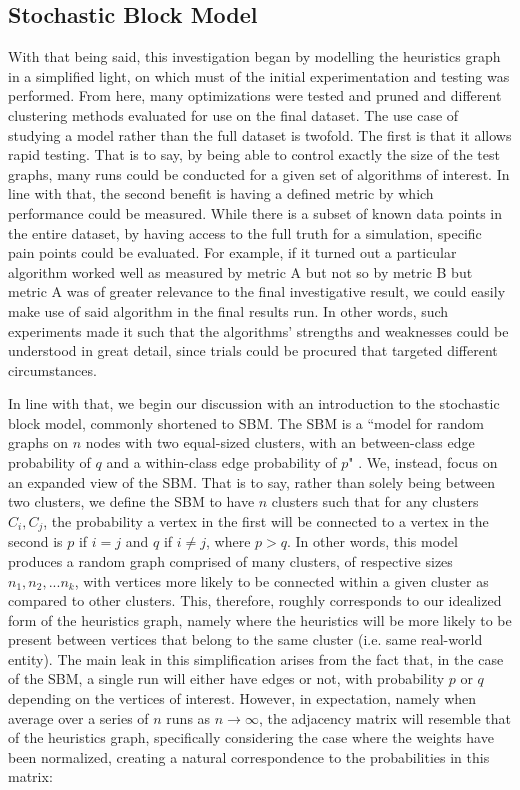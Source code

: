 \documentclass[journal]{IEEEtran}
\begin{document}
\subsection{Stochastic Block Model}
With that being said, this investigation began by modelling the heuristics graph in a simplified light, on which must of the initial experimentation and testing was performed. From here, many optimizations were tested and pruned and different clustering methods evaluated for use on the final dataset. The use case of studying a model rather than the full dataset is twofold. The first is that it allows rapid testing. That is to say, by being able to control exactly the size of the test graphs, many runs could be conducted for a given set of algorithms of interest. In line with that, the second benefit is having a defined metric by which performance could be measured. While there is a subset of known data points in the entire dataset, by having access to the full truth for a simulation, specific pain points could be evaluated. For example, if it turned out a particular algorithm worked well as measured by metric A but not so by metric B but metric A was of greater relevance to the final investigative result, we could easily make use of said algorithm in the final results run. In other words, such experiments made it such that the algorithms' strengths and weaknesses could be understood in great detail, since trials could be procured that targeted different circumstances.

In line with that, we begin our discussion with an introduction to the stochastic block model, commonly shortened to SBM. The SBM is a ``model for random graphs on $n$ nodes with two equal-sized clusters, with an between-class edge probability of $q$ and a within-class edge probability of $p$" \cite{sbm}. We, instead, focus on an expanded view of the SBM. That is to say, rather than solely being between two clusters, we define the SBM to have $n$ clusters such that for any clusters $C_i, C_j$, the probability a vertex in the first will be connected to a vertex in the second is $p$ if $i=j$ and $q$ if $i\neq j$, where $p > q$. In other words, this model produces a random graph comprised of many clusters, of respective sizes $n_1,n_2,...n_k$, with vertices more likely to be connected within a given cluster as compared to other clusters. This, therefore, roughly corresponds to our idealized form of the heuristics graph, namely where the heuristics will be more likely to be present between vertices that belong to the same cluster (i.e. same real-world entity). The main leak in this simplification arises from the fact that, in the case of the SBM, a single run will either have edges or not, with probability $p$ or $q$ depending on the vertices of interest. However, in expectation, namely when average over a series of $n$ runs as $n\rightarrow\infty$, the adjacency matrix will resemble that of the heuristics graph, specifically considering the case where the weights have been normalized, creating a natural correspondence to the probabilities in this matrix:
\end{document}
